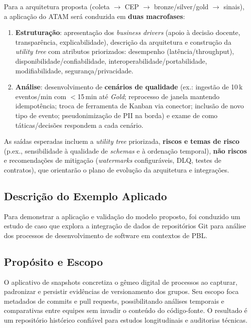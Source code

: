 \documentclass[12pt,a4paper]{article}
\begin{document}
Para a arquitetura proposta (coleta $\to$ CEP $\to$ bronze/silver/gold $\to$
sinais), a aplicação do ATAM será conduzida em \textbf{duas macrofases}:
\begin{enumerate}
  \item \textbf{Estruturação}: apresentação dos \textit{business drivers}
  (apoio à decisão docente, transparência, explicabilidade), descrição da
  arquitetura e construção da \textit{utility tree} com atributos priorizados:
  desempenho (latência/throughput), disponibilidade/confiabilidade,
  interoperabilidade/portabilidade, modifiabilidade, segurança/privacidade.
  \item \textbf{Análise}: desenvolvimento de \textbf{cenários de qualidade}
  (ex.: ingestão de 10\,k eventos/min com \(<\)15\,min até \emph{Gold};
  reprocesso de janela mantendo idempotência; troca de ferramenta de Kanban via
  conector; inclusão de novo tipo de evento; pseudonimização de PII na borda) e
  exame de como táticas/decisões respondem a cada cenário.
\end{enumerate}

As saídas esperadas incluem a \textit{utility tree} priorizada, \textbf{riscos e
temas de risco} (p.ex., sensibilidade à qualidade de \textit{schemas} e à
ordenação temporal), \textbf{não riscos} e recomendações de mitigação
(\emph{watermarks} configuráveis, DLQ, testes de contratos), que orientarão o
plano de evolução da arquitetura e integrações.

\subsection{Descrição do Exemplo Aplicado}

Para demonstrar a aplicação e validação do modelo proposto, foi conduzido um estudo de caso que explora a integração de dados de repositórios Git para análise dos processos de desenvolvimento de software em contextos de PBL.

\fi

\subsection{Propósito e Escopo}

O aplicativo de snapshots concretiza o gêmeo digital de processos ao capturar, padronizar e persistir evidências de versionamento dos grupos. Seu escopo foca metadados de commits e pull requests, possibilitando análises temporais e comparativas entre equipes sem invadir o conteúdo do código-fonte. O resultado é um repositório histórico confiável para estudos longitudinais e auditorias técnicas.
\end{document}
